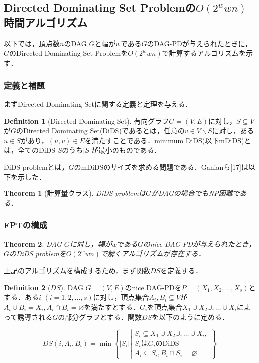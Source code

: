 \documentclass[master]{kuisthesis}		%
\theoremstyle{plain}
\newtheorem{theorem}{Theorem}
\theoremstyle{definition}
\newtheorem{definition*}{Definition}
\begin{document}
\subsection{Directed Dominating Set Problemの$O(2^wwn)$時間アルゴリズム}

以下では，頂点数$n$のDAG $G$と幅が$w$である$G$のDAG-PDが与えられたときに，$G$のDirected Dominating Set Problemを$O(2^wwn)$で計算するアルゴリズムを示す．

\subsubsection{定義と補題}
まずDirected Dominating Setに関する定義と定理を与える．

\begin{definition*}[Directed Dominating Set]
    有向グラフ$G=(V, E)$に対し，$S \subseteq V$が$G$のDirected Dominating Set(DiDS)であるとは，任意の$v \in V\backslash S$に対し，ある$u \in S$があり，$(u, v) \in E$を満たすことである．minimum DiDS(以下mDiDS)とは，全てのDiDS $S$のうち$|S|$が最小のものである．
\end{definition*}

DiDS problemとは，$G$のmDiDSのサイズを求める問題である．Ganianら[17]は以下を示した．

\begin{theorem}[計算量クラス]
    DiDS problemは$G$がDAGの場合でもNP困難である．
\end{theorem}



\subsubsection{FPTの構成}

\begin{theorem}
    DAG $G$に対し，幅が$w$である$G$のnice DAG-PDが与えられたとき，$G$のDiDS problemを$O(2^wwn)$で解くアルゴリズムが存在する．
\end{theorem}

上記のアルゴリズムを構成するため，まず関数$DS$を定義する．

\begin{definition*}[$DS$]
    DAG $G=(V, E)$のnice DAG-PDを$P=(X_1, X_2, \dots , X_s)$とする．ある$i$ $(i=1, 2, \dots , s)$に対し，頂点集合$A_i, B_i \subseteq V$が$A_i \cup B_i = X_i, A_i \cap B_i = \varnothing$を満たすとする．$G_i$を頂点集合$X_1 \cup X_2 \cup,  \dots \cup X_i$によって誘導される$G$の部分グラフとする．関数$DS$を以下のように定める．

    \begin{equation}\label{def_ds}
        DS(i, A_i, B_i) = \min \left\{ |S_i| \left |
        \begin{array}{l}
            S_i \subseteq X_1 \cup X_2 \cup,  \dots \cup X_i, \\
            S_i \text{は} G_i \text{のDiDS} \\
            A_i \subseteq S_i, B_i \cap S_i = \varnothing
        \end{array}
        \right. \right\}
    \end{equation}
\end{definition*}
\end{document}
